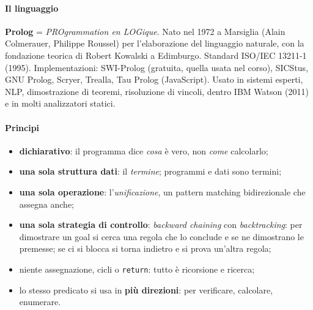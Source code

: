 \documentclass[a4paper,12pt]{article}
\begin{document}
\paragraph{Il linguaggio} \textbf{Prolog} = \emph{PROgrammation en LOGique}. Nato nel 1972 a
Marsiglia (Alain Colmerauer, Philippe Roussel) per l'elaborazione del linguaggio naturale, con
la fondazione teorica di Robert Kowalski a Edimburgo. Standard ISO/IEC 13211-1 (1995).
Implementazioni: SWI-Prolog (gratuita, quella usata nel corso), SICStus, GNU Prolog, Scryer,
Trealla, Tau Prolog (JavaScript). Usato in sistemi esperti, NLP, dimostrazione di teoremi,
risoluzione di vincoli, dentro IBM Watson (2011) e in molti analizzatori statici.

\paragraph{Principi}
\begin{itemize}[nosep]
  \item \textbf{dichiarativo}: il programma dice \emph{cosa} è vero, non \emph{come} calcolarlo;
  \item \textbf{una sola struttura dati}: il \emph{termine}; programmi e dati sono termini;
  \item \textbf{una sola operazione}: l'\emph{unificazione}, un pattern matching bidirezionale
        che assegna anche;
  \item \textbf{una sola strategia di controllo}: \emph{backward chaining} con
        \emph{backtracking}: per dimostrare un goal si cerca una regola che lo conclude e se ne
        dimostrano le premesse; se ci si blocca si torna indietro e si prova un'altra regola;
  \item niente assegnazione, cicli o \texttt{return}: tutto è ricorsione e ricerca;
  \item lo stesso predicato si usa in \textbf{più direzioni}: per verificare, calcolare,
        enumerare.
\end{itemize}
\end{document}
